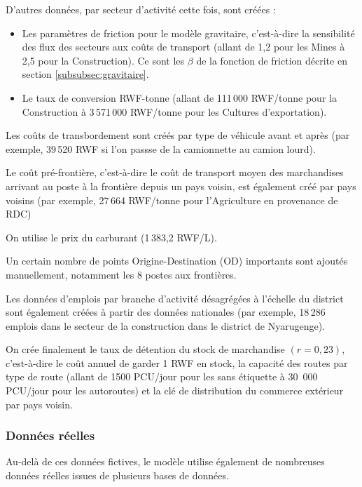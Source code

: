 \documentclass[12pt,a4paper,french]{report}
\begin{document}
		D'autres données, par secteur d'activité cette fois, sont créées :
	
	\begin{itemize}
		\item Les paramètres de friction pour le modèle gravitaire, c'est-à-dire la sensibilité des flux des secteurs aux coûts de transport (allant de 1,2 pour les Mines à 2,5 pour la Construction). Ce sont les $\beta$ de la fonction de friction décrite en section \ref{subsubsec:gravitaire}.
		\item Le taux de conversion RWF-tonne (allant de 111\,000 RWF/tonne pour la Construction à 3\,571\,000 RWF/tonne pour les Cultures d'exportation).
	\end{itemize}
	\medskip
	
	Les coûts de transbordement sont créés par type de véhicule avant et après (par exemple, 39\,520 RWF si l'on passse de la camionnette au camion lourd).
	
	Le coût pré-frontière, c'est-à-dire le coût de transport moyen des marchandises arrivant au poste à la frontière depuis un pays voisin, est également créé par pays voisins (par exemple, 27\,664 RWF/tonne pour l'Agriculture en provenance de RDC)
	
	On utilise le prix du carburant (1\,383,2 RWF/L).
	
	Un certain nombre de points Origine-Destination (OD) importants sont ajoutés manuellement, notamment les 8 postes aux frontières.
	
	Les données d'emplois par branche d'activité désagrégées à l'échelle du district sont également créées à partir des données nationales (par exemple, 18\,286 emplois dans le secteur de la construction dans le district de Nyarugenge).
	\medskip
	
	On crée finalement le taux de détention du stock de marchandise $(r = 0,23)$, c'est-à-dire le coût annuel de garder 1 RWF en stock, la capacité des routes par type de route (allant de 1500 PCU/jour pour les sans étiquette à 30~000 PCU/jour pour les autoroutes) et la clé de distribution du commerce extérieur par pays voisin.
	
	\subsubsection{Données réelles}
	\label{subsubsec:donnees_reelles}
	
	Au-delà de ces données fictives, le modèle utilise également de nombreuses données réelles issues de plusieurs bases de données.
	
\end{document}
